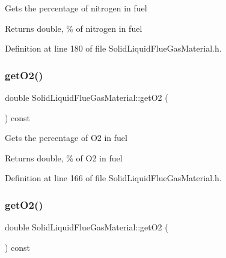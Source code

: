 Gets the percentage of nitrogen in fuel \begin{DoxyReturn}{Returns}
double, \% of nitrogen in fuel 
\end{DoxyReturn}


Definition at line 180 of file Solid\+Liquid\+Flue\+Gas\+Material.\+h.

\mbox{\label{class_solid_liquid_flue_gas_material_a08d588e576f605d3f9925cb649e1105e}} 
\subsubsection{\texorpdfstring{get\+O2()}{getO2()}\hspace{0.1cm}{\footnotesize\ttfamily [1/3]}}
{\footnotesize\ttfamily double Solid\+Liquid\+Flue\+Gas\+Material\+::get\+O2 (\begin{DoxyParamCaption}{ }\end{DoxyParamCaption}) const\hspace{0.3cm}{\ttfamily [inline]}}

Gets the percentage of O2 in fuel \begin{DoxyReturn}{Returns}
double, \% of O2 in fuel 
\end{DoxyReturn}


Definition at line 166 of file Solid\+Liquid\+Flue\+Gas\+Material.\+h.

\mbox{\label{class_solid_liquid_flue_gas_material_a08d588e576f605d3f9925cb649e1105e}} 
\subsubsection{\texorpdfstring{get\+O2()}{getO2()}\hspace{0.1cm}{\footnotesize\ttfamily [2/3]}}
{\footnotesize\ttfamily double Solid\+Liquid\+Flue\+Gas\+Material\+::get\+O2 (\begin{DoxyParamCaption}{ }\end{DoxyParamCaption}) const\hspace{0.3cm}{\ttfamily [inline]}}

